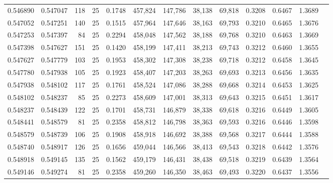 \begin{tabular}{rrrrrrrrrrrrr}
0.546890 & 0.547047 &   118 &  25 &                                     0.1748 & 457,824 & 147,786 &  38,138 &  69,818 & 0.3208 & 0.6467 & 1.3689 \\
0.547052 & 0.547251 &   140 &  25 &                                     0.1515 & 457,964 & 147,646 &  38,163 &  69,793 & 0.3210 & 0.6465 & 1.3676 \\
0.547253 & 0.547397 &    84 &  25 &                                     0.2294 & 458,048 & 147,562 &  38,188 &  69,768 & 0.3210 & 0.6463 & 1.3669 \\
0.547398 & 0.547627 &   151 &  25 &                                     0.1420 & 458,199 & 147,411 &  38,213 &  69,743 & 0.3212 & 0.6460 & 1.3655 \\
0.547627 & 0.547779 &   103 &  25 &                                     0.1953 & 458,302 & 147,308 &  38,238 &  69,718 & 0.3212 & 0.6458 & 1.3645 \\
0.547780 & 0.547938 &   105 &  25 &                                     0.1923 & 458,407 & 147,203 &  38,263 &  69,693 & 0.3213 & 0.6456 & 1.3635 \\
0.547938 & 0.548102 &   117 &  25 &                                     0.1761 & 458,524 & 147,086 &  38,288 &  69,668 & 0.3214 & 0.6453 & 1.3625 \\
0.548102 & 0.548237 &    85 &  25 &                                     0.2273 & 458,609 & 147,001 &  38,313 &  69,643 & 0.3215 & 0.6451 & 1.3617 \\
0.548237 & 0.548439 &   122 &  25 &                                     0.1701 & 458,731 & 146,879 &  38,338 &  69,618 & 0.3216 & 0.6449 & 1.3605 \\
0.548441 & 0.548579 &    81 &  25 &                                     0.2358 & 458,812 & 146,798 &  38,363 &  69,593 & 0.3216 & 0.6446 & 1.3598 \\
0.548579 & 0.548739 &   106 &  25 &                                     0.1908 & 458,918 & 146,692 &  38,388 &  69,568 & 0.3217 & 0.6444 & 1.3588 \\
0.548740 & 0.548917 &   126 &  25 &                                     0.1656 & 459,044 & 146,566 &  38,413 &  69,543 & 0.3218 & 0.6442 & 1.3576 \\
0.548918 & 0.549145 &   135 &  25 &                                     0.1562 & 459,179 & 146,431 &  38,438 &  69,518 & 0.3219 & 0.6439 & 1.3564 \\
0.549146 & 0.549274 &    81 &  25 &                                     0.2358 & 459,260 & 146,350 &  38,463 &  69,493 & 0.3220 & 0.6437 & 1.3556 \\

\end{tabular}
